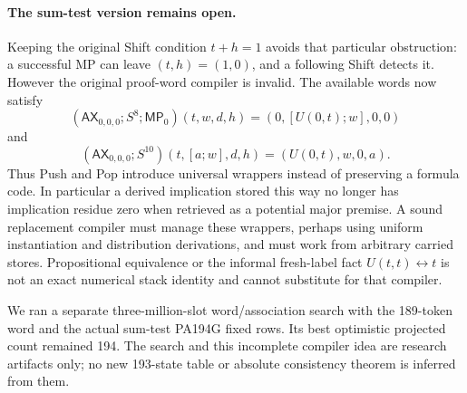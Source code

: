 \paragraph{The sum-test version remains open.}
Keeping the original Shift condition $t+h=1$ avoids that particular
obstruction: a successful MP can leave $(t,h)=(1,0)$, and a following
Shift detects it. However the original proof-word compiler is invalid.
The available words now satisfy
\[
 (\mathsf{AX}_{0,0,0};S^8;\mathsf{MP}_0)(t,w,d,h)
       =(0,[U(0,t);w],0,0)
\]
and
\[
 (\mathsf{AX}_{0,0,0};S^{10})(t,[a;w],d,h)
       =(U(0,t),w,0,a).
\]
Thus Push and Pop introduce universal wrappers instead of preserving a
formula code. In particular a derived implication stored this way no
longer has implication residue zero when retrieved as a potential major
premise. A sound replacement compiler must manage these wrappers, perhaps
using uniform instantiation and distribution derivations, and must work
from arbitrary carried stores. Propositional equivalence or the informal
fresh-label fact $U(t,t)\leftrightarrow t$ is not an exact numerical stack
identity and cannot substitute for that compiler.

We ran a separate three-million-slot word/association search with the
189-token word and the actual sum-test PA194G fixed rows. Its best
optimistic projected count remained 194. The search and this incomplete
compiler idea are research artifacts only; no new 193-state table or
absolute consistency theorem is inferred from them.
